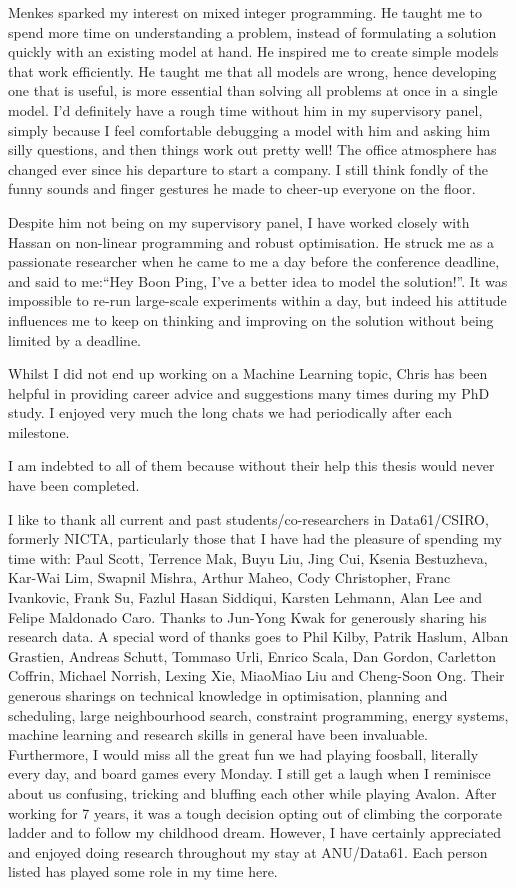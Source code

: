 Menkes sparked my interest on mixed integer programming. 
He taught me to spend more time on understanding a problem, instead of formulating a solution quickly with an existing model at hand. 
He inspired me to create simple models that work efficiently. He taught me that all models are wrong, hence developing one that is useful, is more essential than solving all problems at once in a single model.
I'd definitely have a rough time without him in my supervisory panel, simply because I feel comfortable debugging a model with him and asking him silly questions, and then things work out pretty well! 
The office atmosphere has changed ever since his departure to start a company. I still think fondly of the funny sounds and finger gestures he made to cheer-up everyone on the floor. 

Despite him not being on my supervisory panel, I have worked closely with Hassan on non-linear programming and robust optimisation. He struck me as a passionate researcher when he came to me a day before the conference deadline, and said to me:``Hey Boon Ping, I've a better idea to model the solution!''. It was impossible to re-run large-scale experiments within a day, but indeed his attitude influences me to keep on thinking and improving on the solution without being limited by a deadline. 

Whilst I did not end up working on a Machine Learning topic, Chris has been helpful in providing career advice and suggestions many times during my PhD study. I enjoyed very much the long chats we had periodically after each milestone.

I am indebted to all of them because without their help this thesis would never have been completed.

I like to thank all current and past students/co-researchers in Data61/CSIRO, formerly NICTA, particularly those that I have had the pleasure of spending my time with: Paul Scott, Terrence Mak, Buyu Liu, Jing Cui, Ksenia Bestuzheva, Kar-Wai Lim, Swapnil Mishra, Arthur Maheo, Cody Christopher, Franc Ivankovic, Frank Su, Fazlul Hasan Siddiqui, Karsten Lehmann, Alan Lee and Felipe Maldonado Caro. Thanks to Jun-Yong Kwak for generously sharing his research data. A special word of thanks goes to Phil Kilby, Patrik Haslum, Alban Grastien, Andreas Schutt, Tommaso Urli, Enrico Scala, Dan Gordon, Carletton Coffrin, Michael Norrish, Lexing Xie, MiaoMiao Liu and Cheng-Soon Ong. Their generous sharings on technical knowledge in optimisation, planning and scheduling, large neighbourhood search, constraint programming, energy systems, machine learning and research skills in general have been invaluable. Furthermore, I would miss all the great fun we had playing foosball, literally every day, and board games every Monday. I still get a laugh when I reminisce about us confusing, tricking and bluffing each other while playing Avalon. After working for 7 years, it was a tough decision opting out of climbing the corporate ladder and to follow my childhood dream. However, I have certainly appreciated and enjoyed doing research throughout my stay at ANU/Data61. Each person listed has played some role in my time here. 

